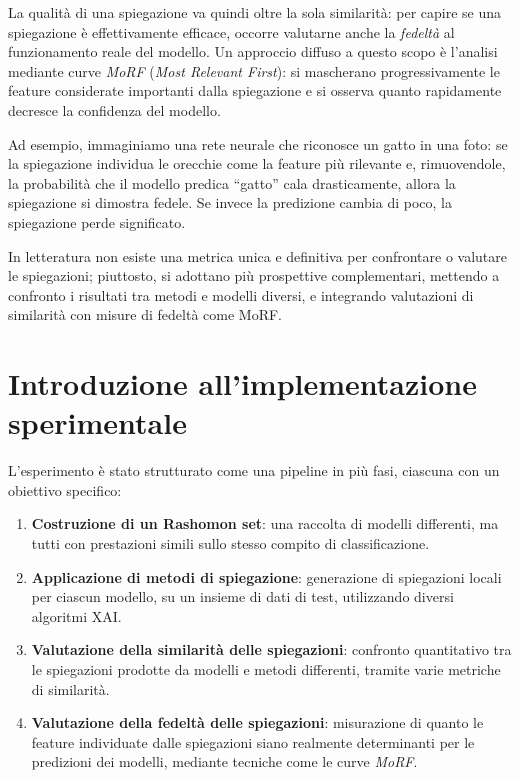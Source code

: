 \documentclass{article}
\begin{document}
La qualità di una spiegazione va quindi oltre la sola similarità: per capire se
una spiegazione è effettivamente efficace, occorre valutarne anche la
\emph{fedeltà} al funzionamento reale del modello. Un approccio diffuso a
questo scopo è l’analisi mediante curve \emph{MoRF} (\emph{Most Relevant
      First}): si mascherano progressivamente le feature considerate importanti dalla
spiegazione e si osserva quanto rapidamente decresce la confidenza del modello.

Ad esempio, immaginiamo una rete neurale che riconosce un gatto in una foto: se
la spiegazione individua le orecchie come la feature più rilevante e,
rimuovendole, la probabilità che il modello predica “gatto” cala drasticamente,
allora la spiegazione si dimostra fedele. Se invece la predizione cambia di
poco, la spiegazione perde significato.

In letteratura non esiste una metrica unica e definitiva per confrontare o
valutare le spiegazioni; piuttosto, si adottano più prospettive complementari,
mettendo a confronto i risultati tra metodi e modelli diversi, e integrando
valutazioni di similarità con misure di fedeltà come MoRF.

\section{Introduzione all’implementazione sperimentale}

L’esperimento è stato strutturato come una pipeline in più fasi, ciascuna con
un obiettivo specifico:

\begin{enumerate}
      \item \textbf{Costruzione di un Rashomon set}: una raccolta di modelli differenti, ma tutti con prestazioni simili sullo stesso compito di classificazione.
      \item \textbf{Applicazione di metodi di spiegazione}: generazione di spiegazioni locali per ciascun modello, su un insieme di dati di test, utilizzando diversi algoritmi XAI.
      \item \textbf{Valutazione della similarità delle spiegazioni}: confronto quantitativo tra le spiegazioni prodotte da modelli e metodi differenti, tramite varie metriche di similarità.
      \item \textbf{Valutazione della fedeltà delle spiegazioni}: misurazione di quanto le feature individuate dalle spiegazioni siano realmente determinanti per le predizioni dei modelli, mediante tecniche come le curve \emph{MoRF}.
\end{enumerate}
\end{document}
